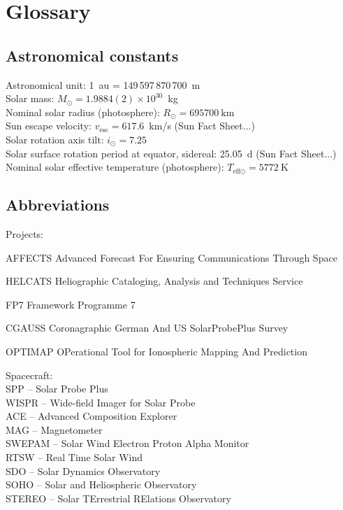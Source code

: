 
\chapter{Glossary}
\label{chap:glossary}

\section{Astronomical constants}
\label{sec:astronomical_constants}

Astronomical unit: 1~au = 149\,597\,870\,700~m \citep{USNO2015}\\ %
Solar mass: $M_\odot = 1.9884(2)\times10^{30}$~kg \citep{USNO2015}\\ %
Nominal solar radius (photosphere): $R_\odot = \SI{695700}{\km}$ \citep{Mamajek2015}\\ %
Sun escape velocity: $v_\text{esc} = 617.6$~km/s (Sun Fact Sheet...)\\
Solar rotation axis tilt: $i_\odot = 7.25$\textdegree{} \citep{USNO2015}\\ %
Solar surface rotation period at equator, sidereal: 25.05~d (Sun Fact Sheet...)\\
Nominal solar effective temperature (photosphere): $T_{\text{eff}\odot} = \SI{5772}{\kelvin}$ \citep{Mamajek2015}\\



\section{Abbreviations}
\label{sec:abbreviations}

Projects:
\begin{description*}
	\item[AFFECTS] Advanced Forecast For Ensuring Communications Through Space
	\item[HELCATS] Heliographic Cataloging, Analysis and Techniques Service
	\item[FP7] Framework Programme 7
	\item[CGAUSS] Coronagraphic German And US SolarProbePlus Survey
	\item[OPTIMAP] OPerational Tool for Ionospheric Mapping And Prediction
\end{description*}

Spacecraft:\\
SPP -- Solar Probe Plus\\
WISPR -- Wide-field Imager for Solar Probe\\
ACE -- Advanced Composition Explorer\\
	MAG -- Magnetometer\\
	SWEPAM -- Solar Wind Electron Proton Alpha Monitor\\
	RTSW -- Real Time Solar Wind\\
SDO -- Solar Dynamics Observatory\\
SOHO -- Solar and Heliospheric Observatory\\
STEREO -- Solar TErrestrial RElations Observatory\\

